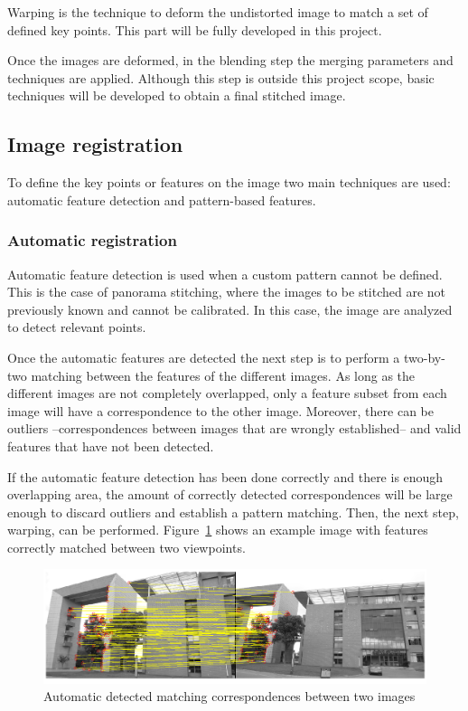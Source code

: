 Warping is the technique to deform the undistorted image to match a set of defined key points. This part will be fully developed in this project.

Once the images are deformed, in the blending step the merging parameters and techniques are applied. Although this step is outside this project scope, basic techniques will be developed to obtain a final stitched image.

\subsection{Image registration}
To define the key points or features on the image two main techniques are used: automatic feature detection and pattern-based features.

\subsubsection{Automatic registration}
Automatic feature detection is used when a custom pattern cannot be defined. This is the case of panorama stitching, where the images to be stitched are not previously known and cannot be calibrated. In this case, the image are analyzed to detect relevant points.

Once the automatic features are detected the next step is to perform a two-by-two matching between the features of the different images. As long as the different images are not completely overlapped, only a feature subset from each image will have a correspondence to the other image. Moreover, there can be outliers --correspondences between images that are wrongly established-- and valid  features that have not been detected.

If the automatic feature detection  has been done correctly and there is enough overlapping area, the amount of  correctly detected correspondences will be large enough to discard outliers and establish a pattern matching. Then, the next step, warping, can be performed. Figure~\ref{fig:autocorresp} shows an example image with features correctly matched between two viewpoints.
\begin{figure}[h]
\centering
\includegraphics[width=\textwidth]{images/correspondence}
\caption{Automatic detected matching correspondences between two images  \cite{tongji}}
\label{fig:autocorresp}
\end{figure}

